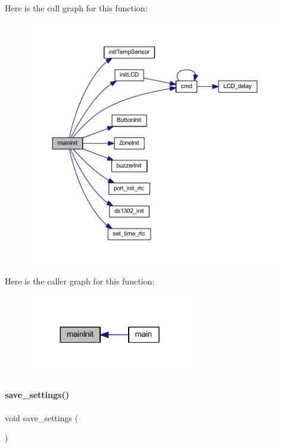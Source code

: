 Here is the call graph for this function\+:
\nopagebreak
\begin{figure}[H]
\begin{center}
\leavevmode
\includegraphics[width=350pt]{a00038_a88b0add1a6947e73e483af43e2203766_cgraph}
\end{center}
\end{figure}
Here is the caller graph for this function\+:
\nopagebreak
\begin{figure}[H]
\begin{center}
\leavevmode
\includegraphics[width=204pt]{a00038_a88b0add1a6947e73e483af43e2203766_icgraph}
\end{center}
\end{figure}
\mbox{\label{a00038_a4ea9ddbddca3d537bf00dcbd508a6434}} 
\paragraph{save\+\_\+settings()}
{\footnotesize\ttfamily void save\+\_\+settings (\begin{DoxyParamCaption}{ }\end{DoxyParamCaption})}

